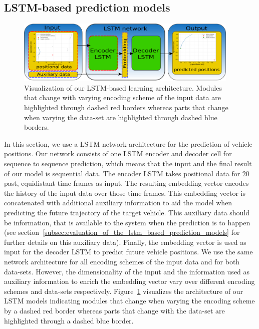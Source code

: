 \subsection{\acs{LSTM}-based prediction models}%
\label{subsec:lstm_based_prediction_models}

\begin{figure}[t!]
  \centering
  \includegraphics[width=0.95\textwidth]{imgs/lstm_arch.eps}
  \caption{Visualization of our \ac{LSTM}-based learning architecture. Modules that change with varying encoding scheme of the input data are highlighted through dashed red borders whereas parts that change when varying the data-set are highlighted through dashed blue borders.}\label{fig:lstm_arch}
\end{figure}

In this section, we use a \acf{LSTM} \cite{Hochreiter1997} network-architecture for the prediction of vehicle positions.
Our network consists of one \ac{LSTM} encoder and decoder cell for sequence to sequence prediction, which means that the input and the final result of our model is sequential data.
The encoder \ac{LSTM} takes positional data for $20$ past, equidistant time frames as input.
The resulting embedding vector encodes the history of the input data over those time frames.
This embedding vector is concatenated with additional auxiliary information to aid the model when predicting the future trajectory of the target vehicle.
This auxiliary data should be information, that is available to the system when the prediction is to happen (see section~\ref{subsec:evaluation_of_the_lstm_based_prediction_models} for further details on this auxiliary data).
Finally, the embedding vector is used as input for the decoder \ac{LSTM} to predict future vehicle positions.
We use the same network architecture for all encoding schemes of the input data and for both data-sets.
However, the dimensionality of the input and the information used as auxiliary information to enrich the embedding vector vary over different encoding schemes and data-sets respectively.
Figure~\ref{fig:lstm_arch} visualizes the architecture of our \ac{LSTM} models indicating modules that change when varying the encoding scheme by a dashed red border whereas parts that change with the data-set are highlighted through a dashed blue border.

